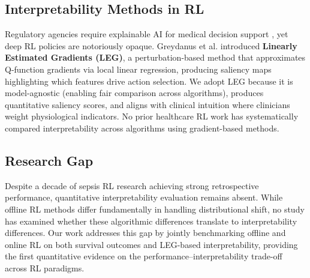 \subsection{Interpretability Methods in RL}\label{sec:related:interp}

Regulatory agencies require explainable AI for medical decision support \citep{holzinger2017xai_healthcare}, yet deep RL policies are notoriously opaque. Greydanus et al. \citeyearpar{greydanus2018leg} introduced \textbf{Linearly Estimated Gradients (LEG)}, a perturbation-based method that approximates Q-function gradients via local linear regression, producing saliency maps highlighting which features drive action selection. We adopt LEG because it is model-agnostic (enabling fair comparison across algorithms), produces quantitative saliency scores, and aligns with clinical intuition where clinicians weight physiological indicators. No prior healthcare RL work has systematically compared interpretability across algorithms using gradient-based methods.


\subsection{Research Gap}\label{sec:related:gap}

Despite a decade of sepsis RL research achieving strong retrospective performance, quantitative interpretability evaluation remains absent. While offline RL methods differ fundamentally in handling distributional shift, no study has examined whether these algorithmic differences translate to interpretability differences. Our work addresses this gap by jointly benchmarking offline and online RL on both survival outcomes and LEG-based interpretability, providing the first quantitative evidence on the performance--interpretability trade-off across RL paradigms.

